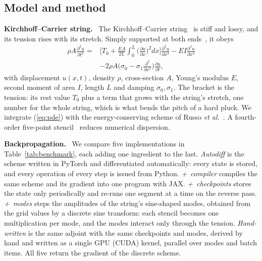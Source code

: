 \documentclass[a4paper]{article}
\newcommand{\head}[1]{\par\vspace{1pt}\noindent\textbf{#1.}\ \ignorespaces}
\begin{document}
\begin{sloppy}
\section{Model and method}
\head{Kirchhoff--Carrier string}
The Kirchhoff--Carrier string~\cite[Sec.~8.1]{bilbao2009} is stiff and lossy,
and its tension rises with its stretch. Simply supported at both
ends~\cite{russo2026}, it obeys
\begin{equation}
\begin{aligned}
\rho A\frac{\partial^2u}{\partial t^2}={}&
 \bigg[T_0+\frac{EA}{2L}\!\int_0^L\!\Big(\frac{\partial u}{\partial x}\Big)^{\!2}dx\bigg]
 \frac{\partial^2u}{\partial x^2}
 -EI\frac{\partial^4u}{\partial x^4}\\
 &-2\rho A\Big(\sigma_0-\sigma_1\frac{\partial^2}{\partial x^2}\Big)
 \frac{\partial u}{\partial t},
\end{aligned}
\label{eq:pde}
\end{equation}
with displacement $u(x,t)$, density $\rho$, cross-section $A$, Young's
modulus $E$, second moment of area $I$, length $L$ and damping
$\sigma_0,\sigma_1$. The bracket is the tension: its rest value $T_0$ plus a
term that grows with the string's stretch, one number for the whole string,
which is what bends the pitch of a hard pluck. We integrate
(\ref{eq:pde}) with the energy-conserving scheme of Russo \emph{et
al.}~\cite{russo2026}. A fourth-order five-point
stencil~\cite[Sec.~6.3.1]{bilbao2009} reduces
numerical dispersion.

\head{Backpropagation}
We compare five implementations in Table~\ref{tab:benchmark}, each adding
one ingredient to the last. \emph{Autodiff} is the scheme written in
PyTorch and differentiated automatically: every state is stored, and every
operation of every step is issued from Python. \emph{+~compiler} compiles the same scheme and its gradient into
one program with JAX. \emph{+~checkpoints} stores the state only
periodically and re-runs one segment at a time on the reverse pass. \emph{+~modes} steps the amplitudes of the string's sine-shaped modes,
obtained from the grid values by a discrete sine transform: each stencil
becomes one multiplication per mode, and the modes interact only through
the tension.
\emph{Hand-written} is the same adjoint with the same checkpoints and
modes, derived by hand and written as a single GPU (CUDA) kernel, parallel
over modes and batch items. All five return the gradient of the discrete
scheme.


\end{sloppy}
\end{document}
